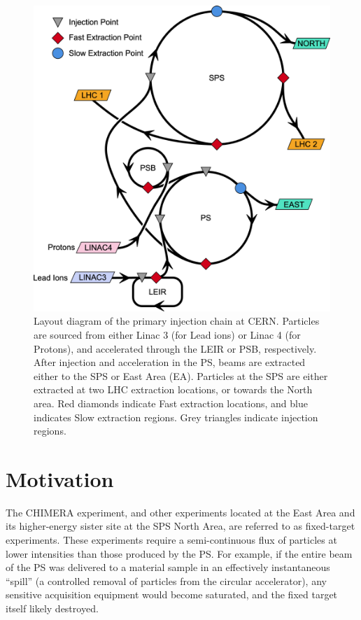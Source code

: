 \documentclass[a4paper,twoside,11pt]{report}
\begin{document}
\begin{figure}
  \centering
  \includegraphics*[width=0.8\linewidth]{complex.png}
  \caption[Layout of the primary injectors and accelerators of the CERN complex]{Layout diagram of the primary injection chain at CERN. Particles are sourced from either Linac 3 (for Lead ions) or Linac 4 (for Protons), and accelerated through the LEIR or PSB, respectively. After injection and acceleration in the PS, beams are extracted either to the SPS or East Area (EA). Particles at the SPS are either extracted at two LHC extraction locations, or towards the North area. Red diamonds indicate Fast extraction locations, and blue indicates Slow extraction regions. Grey triangles indicate injection regions.}\label{fig:chain}
\end{figure}

\section{Motivation}\label{sec:motivation}

The CHIMERA experiment, and other experiments located at the East Area and its higher-energy sister site at the SPS North Area, are referred to as fixed-target experiments. These experiments require a semi-continuous flux of particles at lower intensities than those produced by the PS. For example, if the entire beam of the PS was delivered to a material sample in an effectively instantaneous ``spill'' (a controlled removal of particles from the circular accelerator), any sensitive acquisition equipment would become saturated, and the fixed target itself likely destroyed.
\end{document}
